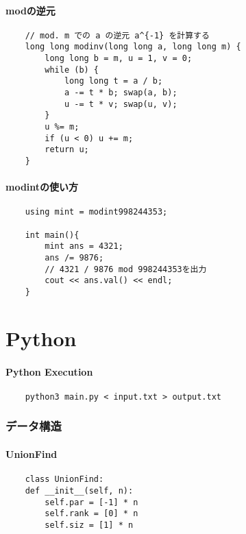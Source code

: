 \documentclass[a4paper, landscape, 9pt]{jarticle} %
\begin{document}
\begin{multicols*}{3}
    \subsection{modの逆元}
    \begin{lstlisting}
    // mod. m での a の逆元 a^{-1} を計算する
    long long modinv(long long a, long long m) {
        long long b = m, u = 1, v = 0;
        while (b) {
            long long t = a / b;
            a -= t * b; swap(a, b);
            u -= t * v; swap(u, v);
        }
        u %= m;
        if (u < 0) u += m;
        return u;
    }
    \end{lstlisting}

    \subsection{modintの使い方}
    \begin{lstlisting}
    using mint = modint998244353;

    int main(){
        mint ans = 4321;
        ans /= 9876;
        // 4321 / 9876 mod 998244353を出力
        cout << ans.val() << endl;
    }
    \end{lstlisting}


    \newpage

    \part{Python}
    \lstset{style=python}
    \setcounter{section}{0}
    \subsection{Python Execution}
    \begin{lstlisting}
    python3 main.py < input.txt > output.txt
    \end{lstlisting}

    \section{データ構造}
    \subsection{UnionFind}
    \begin{lstlisting}
    class UnionFind:
    def __init__(self, n):
        self.par = [-1] * n
        self.rank = [0] * n
        self.siz = [1] * n


\end{lstlisting}
\end{multicols*}
\end{document}
